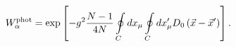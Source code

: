 \begin{equation}
\label{Fp}
W_\alpha^{\rm phot}=\exp\left[-g^2\frac{N-1}{4N}\oint\limits_{C}^{}dx_\mu\oint\limits_{C}^{}dx'_\mu D_0\left(\vec x-\vec x'\right)\right].
\end{equation}

